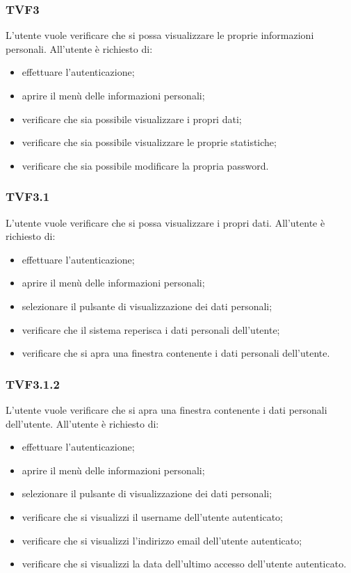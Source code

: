		\subsubsection{TVF3}
			L'utente vuole verificare che si possa visualizzare le proprie informazioni personali. All'utente è richiesto di:
			\begin{itemize}
				\item effettuare l'autenticazione;
				\item aprire il menù delle informazioni personali;
				\item verificare che sia possibile visualizzare i propri dati;
				\item verificare che sia possibile visualizzare le proprie statistiche;
				\item verificare che sia possibile modificare la propria password.
			\end{itemize}
			
		\subsubsection{TVF3.1}
			L'utente vuole verificare che si possa visualizzare i propri dati. All'utente è richiesto di:
			\begin{itemize}
				\item effettuare l'autenticazione;
				\item aprire il menù delle informazioni personali;
				\item selezionare il pulsante di visualizzazione dei dati personali;
				\item verificare che il sistema reperisca i dati personali dell'utente;
				\item verificare che si apra una finestra contenente i dati personali dell'utente.
			\end{itemize}
			
		\subsubsection{TVF3.1.2}
			L'utente vuole verificare che si apra una finestra contenente i dati personali dell'utente. All'utente è richiesto di:
			\begin{itemize}
				\item effettuare l'autenticazione;
				\item aprire il menù delle informazioni personali;
				\item selezionare il pulsante di visualizzazione dei dati personali;
				\item verificare che si visualizzi il username dell'utente autenticato;
				\item verificare che si visualizzi l'indirizzo email dell'utente autenticato;
				\item verificare che si visualizzi la data dell'ultimo accesso dell'utente autenticato.
			\end{itemize}
			
